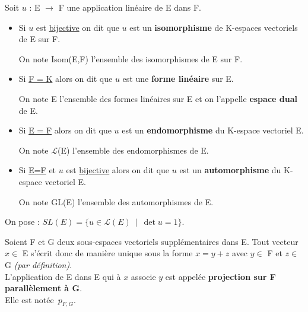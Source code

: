 \noindent Soit $u$ : E \(\to\) F une application linéaire de E dans F.\vspace{-0.1cm}
\begin{itemize}[label=•]
    \item Si $u$ est \underline{bijective} on dit que $u$ est un \textbf{isomorphisme} de K-espaces vectoriels de E sur F.\\
    \begin{small}
        On note Isom(E,F) l'ensemble des isomorphismes de E sur F.
    \end{small}\vspace{0.2cm}

    \item Si \underline{F = K} alors on dit que $u$ est une \textbf{forme linéaire} sur E.\\
    \begin{small}
        On note E\expo{*} l'ensemble des formes linéaires sur E et on l'appelle \textbf{espace dual} de E.
    \end{small}\vspace{0.2cm}

    \item Si \underline{E = F} alors on dit que $u$ est un \textbf{endomorphisme} du K-espace vectoriel E.\\
    \begin{small}
        On note $\mathscr{L}$(E) l'ensemble des endomorphismes de E.
    \end{small}\vspace{0.2cm}

    \item Si \underline{E=F} et $u$ est \underline{bijective} alors on dit que $u$ est un \textbf{automorphisme} du K-espace vectoriel E.\\
    \begin{small}
        On note GL(E) l'ensemble des automorphismes de E.
    \end{small}
\end{itemize}

\vspace{1cm}

\noindent On pose : \(SL(E)=\{u\in \mathscr{L}(E) \ \mid \ \det u=1 \}.\)

\vspace{1.5cm}

Soient F et G deux sous-espaces vectoriels supplémentaires dans E. Tout vecteur \(x\in\) E s'écrit donc de manière unique sous la forme \(x=y+z\) avec \(y\in\) F et \(z\in\) G \emph{(par définition)}. \\
L'application de E dans E qui à $x$ associe $y$ est appelée \textbf{projection sur F parallèlement à G}.\\
Elle est notée \(\,\displaystyle p_{F,G}\).


